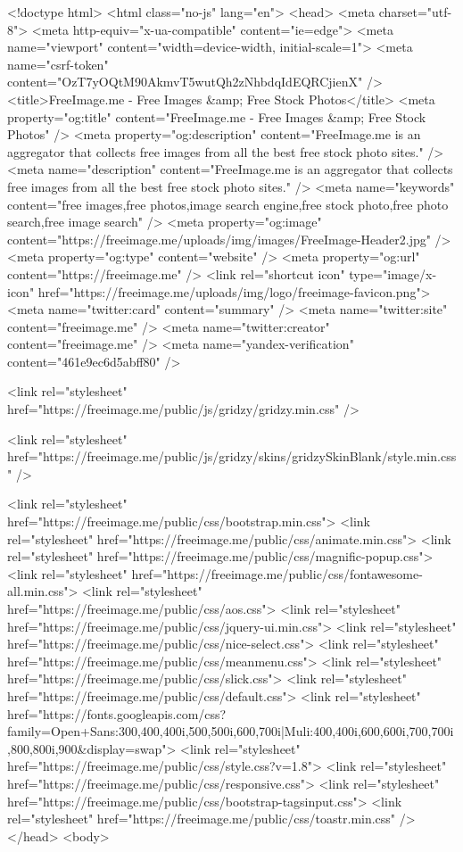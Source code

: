 <!doctype html>
<html class="no-js" lang="en">
<head>
<meta charset="utf-8">
<meta http-equiv="x-ua-compatible" content="ie=edge">
<meta name="viewport" content="width=device-width, initial-scale=1">
<meta name="csrf-token" content="OzT7yOQtM90AkmvT5wutQh2zNhbdqIdEQRCjienX" />
<title>FreeImage.me - Free Images &amp; Free Stock Photos</title>
<meta property="og:title" content="FreeImage.me - Free Images &amp; Free Stock Photos" />
<meta property="og:description" content="FreeImage.me is an aggregator that collects free images from all the best free stock photo sites." />
<meta name="description" content="FreeImage.me is an aggregator that collects free images from all the best free stock photo sites." />
<meta name="keywords" content="free images,free photos,image search engine,free stock photo,free photo search,free image search" />
<meta property="og:image" content="https://freeimage.me/uploads/img/images/FreeImage-Header2.jpg" />
<meta property="og:type" content="website" />
<meta property="og:url" content="https://freeimage.me" />
<link rel="shortcut icon" type="image/x-icon" href="https://freeimage.me/uploads/img/logo/freeimage-favicon.png">
<meta name="twitter:card" content="summary" />
<meta name="twitter:site" content="freeimage.me" />
<meta name="twitter:creator" content="freeimage.me" />
<meta name="yandex-verification" content="461e9ec6d5abff80" />


<link rel="stylesheet" href="https://freeimage.me/public/js/gridzy/gridzy.min.css" />

<link rel="stylesheet" href="https://freeimage.me/public/js/gridzy/skins/gridzySkinBlank/style.min.css" />

<link rel="stylesheet" href="https://freeimage.me/public/css/bootstrap.min.css">
<link rel="stylesheet" href="https://freeimage.me/public/css/animate.min.css">
<link rel="stylesheet" href="https://freeimage.me/public/css/magnific-popup.css">
<link rel="stylesheet" href="https://freeimage.me/public/css/fontawesome-all.min.css">
<link rel="stylesheet" href="https://freeimage.me/public/css/aos.css">
<link rel="stylesheet" href="https://freeimage.me/public/css/jquery-ui.min.css">
<link rel="stylesheet" href="https://freeimage.me/public/css/nice-select.css">
<link rel="stylesheet" href="https://freeimage.me/public/css/meanmenu.css">
<link rel="stylesheet" href="https://freeimage.me/public/css/slick.css">
<link rel="stylesheet" href="https://freeimage.me/public/css/default.css">
<link rel="stylesheet" href="https://fonts.googleapis.com/css?family=Open+Sans:300,400,400i,500,500i,600,700i|Muli:400,400i,600,600i,700,700i,800,800i,900&display=swap">
<link rel="stylesheet" href="https://freeimage.me/public/css/style.css?v=1.8">
<link rel="stylesheet" href="https://freeimage.me/public/css/responsive.css">
<link rel="stylesheet" href="https://freeimage.me/public/css/bootstrap-tagsinput.css">
<link rel="stylesheet" href="https://freeimage.me/public/css/toastr.min.css" />
</head>
<body>

